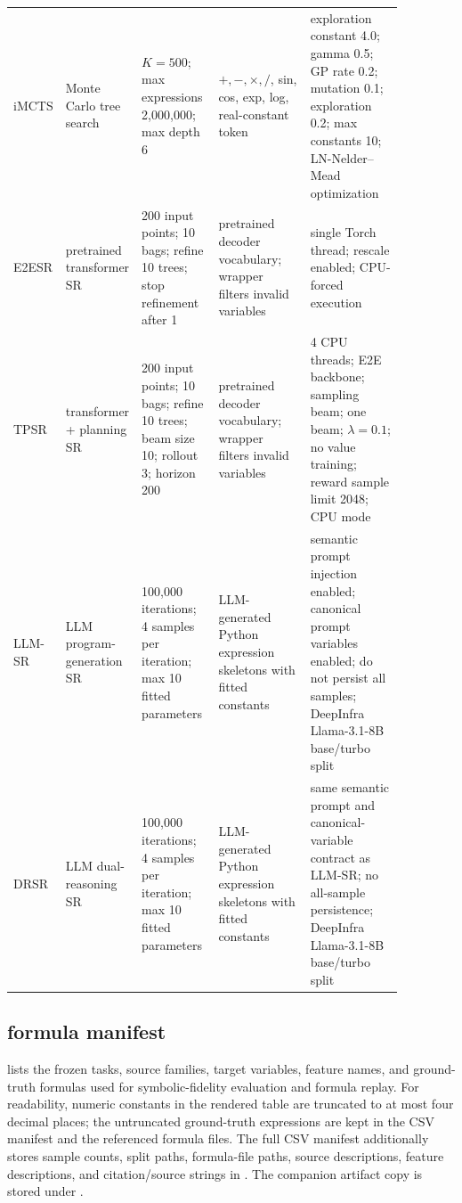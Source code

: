\begin{table}[p]
{\begin{tabular}{lp{0.17\linewidth}p{0.20\linewidth}p{0.25\linewidth}p{0.25\linewidth}}
iMCTS & Monte Carlo tree search & $K=500$; max expressions 2,000,000; max depth 6 & $+,-,\times,/$, sin, cos, exp, log, real-constant token & exploration constant 4.0; gamma 0.5; GP rate 0.2; mutation 0.1; exploration 0.2; max constants 10; LN-Nelder--Mead optimization \\
E2ESR & pretrained transformer SR & 200 input points; 10 bags; refine 10 trees; stop refinement after 1 & pretrained decoder vocabulary; wrapper filters invalid variables & single Torch thread; rescale enabled; CPU-forced execution \\
TPSR & transformer + planning SR & 200 input points; 10 bags; refine 10 trees; beam size 10; rollout 3; horizon 200 & pretrained decoder vocabulary; wrapper filters invalid variables & 4 CPU threads; E2E backbone; sampling beam; one beam; $\lambda=0.1$; no value training; reward sample limit 2048; CPU mode \\
LLM-SR & LLM program-generation SR & 100,000 iterations; 4 samples per iteration; max 10 fitted parameters & LLM-generated Python expression skeletons with fitted constants & semantic prompt injection enabled; canonical prompt variables enabled; do not persist all samples; DeepInfra Llama-3.1-8B base/turbo split \\
DRSR & LLM dual-reasoning SR & 100,000 iterations; 4 samples per iteration; max 10 fitted parameters & LLM-generated Python expression skeletons with fitted constants & same semantic prompt and canonical-variable contract as LLM-SR; no all-sample persistence; DeepInfra Llama-3.1-8B base/turbo split \\
\bottomrule
\end{tabular}
}
\end{table}

\subsection{\core{} formula manifest}

 lists the frozen \core{} tasks, source families, target variables, feature names, and ground-truth formulas used for symbolic-fidelity evaluation and formula replay. For readability, numeric constants in the rendered table are truncated to at most four decimal places; the untruncated ground-truth expressions are kept in the CSV manifest and the referenced formula files. The full CSV manifest additionally stores sample counts, split paths, formula-file paths, source descriptions, feature descriptions, and citation/source strings in . The companion artifact copy is stored under .


